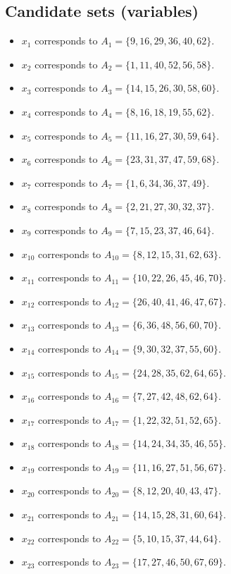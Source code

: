 \documentclass[11pt]{article}
\begin{document}
\subsection*{Candidate sets (variables)}
\begin{itemize}
\item $x_{1}$ corresponds to $A_{1}=\{9, 16, 29, 36, 40, 62\}$.
\item $x_{2}$ corresponds to $A_{2}=\{1, 11, 40, 52, 56, 58\}$.
\item $x_{3}$ corresponds to $A_{3}=\{14, 15, 26, 30, 58, 60\}$.
\item $x_{4}$ corresponds to $A_{4}=\{8, 16, 18, 19, 55, 62\}$.
\item $x_{5}$ corresponds to $A_{5}=\{11, 16, 27, 30, 59, 64\}$.
\item $x_{6}$ corresponds to $A_{6}=\{23, 31, 37, 47, 59, 68\}$.
\item $x_{7}$ corresponds to $A_{7}=\{1, 6, 34, 36, 37, 49\}$.
\item $x_{8}$ corresponds to $A_{8}=\{2, 21, 27, 30, 32, 37\}$.
\item $x_{9}$ corresponds to $A_{9}=\{7, 15, 23, 37, 46, 64\}$.
\item $x_{10}$ corresponds to $A_{10}=\{8, 12, 15, 31, 62, 63\}$.
\item $x_{11}$ corresponds to $A_{11}=\{10, 22, 26, 45, 46, 70\}$.
\item $x_{12}$ corresponds to $A_{12}=\{26, 40, 41, 46, 47, 67\}$.
\item $x_{13}$ corresponds to $A_{13}=\{6, 36, 48, 56, 60, 70\}$.
\item $x_{14}$ corresponds to $A_{14}=\{9, 30, 32, 37, 55, 60\}$.
\item $x_{15}$ corresponds to $A_{15}=\{24, 28, 35, 62, 64, 65\}$.
\item $x_{16}$ corresponds to $A_{16}=\{7, 27, 42, 48, 62, 64\}$.
\item $x_{17}$ corresponds to $A_{17}=\{1, 22, 32, 51, 52, 65\}$.
\item $x_{18}$ corresponds to $A_{18}=\{14, 24, 34, 35, 46, 55\}$.
\item $x_{19}$ corresponds to $A_{19}=\{11, 16, 27, 51, 56, 67\}$.
\item $x_{20}$ corresponds to $A_{20}=\{8, 12, 20, 40, 43, 47\}$.
\item $x_{21}$ corresponds to $A_{21}=\{14, 15, 28, 31, 60, 64\}$.
\item $x_{22}$ corresponds to $A_{22}=\{5, 10, 15, 37, 44, 64\}$.
\item $x_{23}$ corresponds to $A_{23}=\{17, 27, 46, 50, 67, 69\}$.

\end{itemize}
\end{document}
